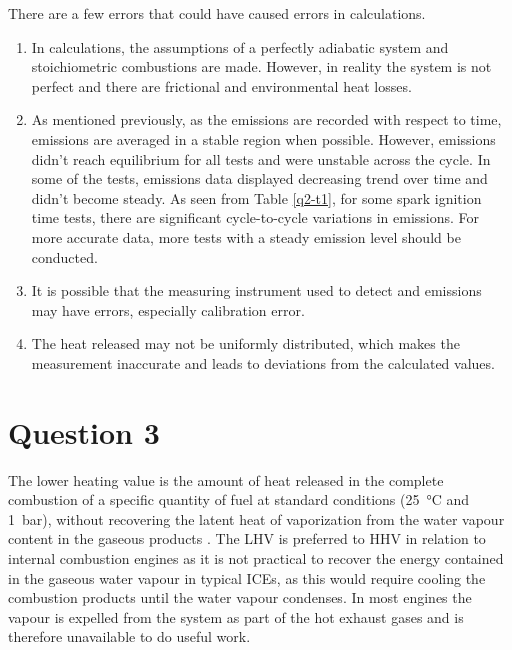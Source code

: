There are a few errors that could have caused errors in calculations.
\begin{enumerate}
    \item In calculations, the assumptions of a perfectly adiabatic system and stoichiometric combustions are made. However, in reality the system is not perfect and there are frictional and environmental heat losses.
    \item As mentioned previously, as the emissions are recorded with respect to time, emissions are averaged in a stable region when possible. However, emissions didn’t reach equilibrium for all tests and were unstable across the cycle. In some of the tests, emissions data displayed decreasing trend over time and didn’t become steady. As seen from Table \ref{q2-t1}, for some spark ignition time tests, there are significant cycle-to-cycle variations in emissions. For more accurate data, more tests with a steady emission level should be conducted.
    \item It is possible that the measuring instrument used to detect  and  emissions may have errors, especially calibration error.
    \item The heat released may not be uniformly distributed, which makes the measurement inaccurate and leads to deviations from the calculated values.
\end{enumerate}
\section{Question 3}
The lower heating value is the amount of heat released in the complete combustion of a specific quantity of fuel at standard conditions (\SI{25}{\celsius} and \SI{1}{\bar}), without recovering the latent heat of vaporization from the water vapour content in the gaseous products \cite{q3-r1}. The LHV is preferred to HHV in relation to internal combustion engines as it is not practical to recover the energy contained in the gaseous water vapour in typical ICEs, as this would require cooling the combustion products until the water vapour condenses. In most engines the vapour is expelled from the system as part of the hot exhaust gases and is therefore unavailable to do useful work.

